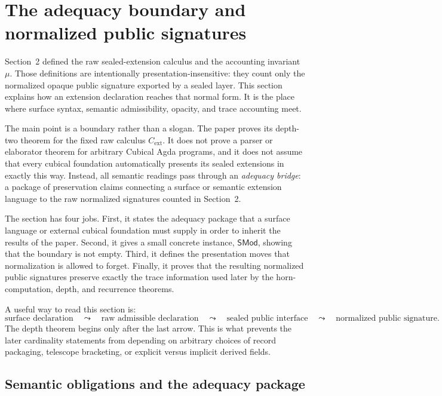 \section{The adequacy boundary and normalized public signatures}

Section~2 defined the raw sealed-extension calculus and the accounting invariant \(\mu\).
Those definitions are intentionally presentation-insensitive: they count only the normalized
opaque public signature exported by a sealed layer.  This section explains how an extension
declaration reaches that normal form.  It is the place where surface syntax, semantic
admissibility, opacity, and trace accounting meet.

The main point is a boundary rather than a slogan.  The paper proves its depth-two theorem
for the fixed raw calculus \(C_{\mathrm{ext}}\).  It does not prove a parser or elaborator
theorem for arbitrary Cubical Agda programs, and it does not assume that every cubical
foundation automatically presents its sealed extensions in exactly this way.  Instead, all
semantic readings pass through an \emph{adequacy bridge}: a package of preservation claims
connecting a surface or semantic extension language to the raw normalized signatures counted
in Section~2.

The section has four jobs.  First, it states the adequacy package that a surface language or
external cubical foundation must supply in order to inherit the results of the paper.  Second,
it gives a small concrete instance, \(\mathsf{SMod}\), showing that the boundary is not empty.
Third, it defines the presentation moves that normalization is allowed to forget.  Finally, it
proves that the resulting normalized public signatures preserve exactly the trace information
used later by the horn-computation, depth, and recurrence theorems.

A useful way to read this section is:
\[
\text{surface declaration}
\quad\leadsto\quad
\text{raw admissible declaration}
\quad\leadsto\quad
\text{sealed public interface}
\quad\leadsto\quad
\text{normalized public signature}.
\]
The depth theorem begins only after the last arrow.  This is what prevents the later
cardinality statements from depending on arbitrary choices of record packaging, telescope
bracketing, or explicit versus implicit derived fields.

\subsection{Semantic obligations and the adequacy package}

